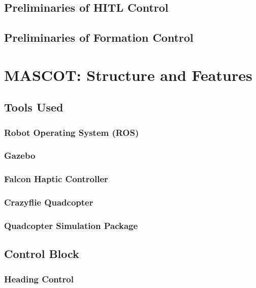 \documentclass[letterpaper, 10 pt, conference]{ieeeconf}
\begin{document}
\subsection{Preliminaries of HITL Control}

\subsection{Preliminaries of Formation Control}





\section{MASCOT: Structure and Features}\label{sec:mascot}



\subsection{Tools Used}\label{subsec:tools}
\subsubsection{Robot Operating System (ROS)}

\subsubsection{Gazebo}

\subsubsection{Falcon Haptic Controller}

\subsubsection{Crazyflie Quadcopter}

\subsubsection{Quadcopter Simulation Package}




\subsection{Control Block}

\subsubsection{Heading Control}
\end{document}
